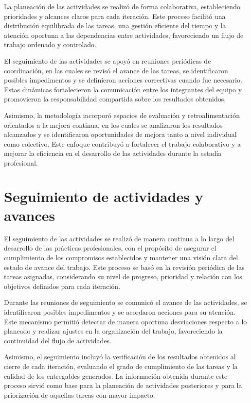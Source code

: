 \documentclass[12pt]{article}
\begin{document}
La planeación de las actividades se realizó de forma colaborativa, estableciendo prioridades y alcances claros para cada iteración. Este proceso facilitó una distribución equilibrada de las tareas, una gestión eficiente del tiempo y la atención oportuna a las dependencias entre actividades, favoreciendo un flujo de trabajo ordenado y controlado.

El seguimiento de las actividades se apoyó en reuniones periódicas de coordinación, en las cuales se revisó el avance de las tareas, se identificaron posibles impedimentos y se definieron acciones correctivas cuando fue necesario. Estas dinámicas fortalecieron la comunicación entre los integrantes del equipo y promovieron la responsabilidad compartida sobre los resultados obtenidos.

Asimismo, la metodología incorporó espacios de evaluación y retroalimentación orientados a la mejora continua, en los cuales se analizaron los resultados alcanzados y se identificaron oportunidades de mejora tanto a nivel individual como colectivo. Este enfoque contribuyó a fortalecer el trabajo colaborativo y a mejorar la eficiencia en el desarrollo de las actividades durante la estadía profesional.


\section*{Seguimiento de actividades y avances}
El seguimiento de las actividades se realizó de manera continua a lo largo del desarrollo de las prácticas profesionales, con el propósito de asegurar el cumplimiento de los compromisos establecidos y mantener una visión clara del estado de avance del trabajo. Este proceso se basó en la revisión periódica de las tareas asignadas, considerando su nivel de progreso, prioridad y relación con los objetivos definidos para cada iteración.

Durante las reuniones de seguimiento se comunicó el avance de las actividades, se identificaron posibles impedimentos y se acordaron acciones para su atención. Este mecanismo permitió detectar de manera oportuna desviaciones respecto a lo planeado y realizar ajustes en la organización del trabajo, favoreciendo la continuidad del flujo de actividades.

Asimismo, el seguimiento incluyó la verificación de los resultados obtenidos al cierre de cada iteración, evaluando el grado de cumplimiento de las tareas y la calidad de los entregables generados. La información obtenida durante este proceso sirvió como base para la planeación de actividades posteriores y para la priorización de aquellas tareas con mayor impacto.
\end{document}
